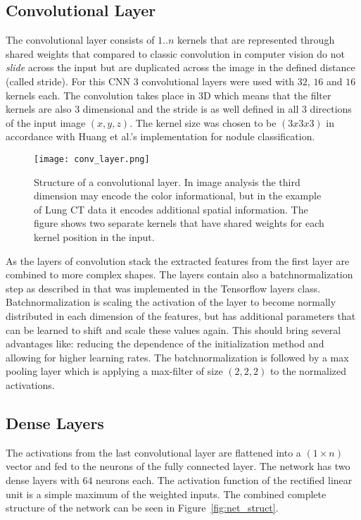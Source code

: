 \documentclass[main.tex]{subfiles}
\begin{document}
\subsection{Convolutional Layer}\label{ss:convlayer}
The convolutional layer consists of $1..n$ kernels that are represented through shared weights that compared to classic convolution in computer vision do not \emph{slide} across the input but are duplicated across the image in the defined distance (called stride). For this CNN $3$ convolutional layers were used with $32$, $16$ and $16$ kernels each. The convolution takes place in 3D which means that the filter kernels are also 3 dimensional and the stride is as well defined in all 3 directions of the input image $(x,y,z)$. The kernel size was chosen to be $(3x3x3)$ in accordance with Huang et al.'s\cite{huang2017lung} implementation for nodule classification. 

\begin{figure}
\begin{center}
\texttt{[image: conv\_layer.png]}
\end{center}
\caption{Structure of a convolutional layer. In image analysis the third dimension may encode the color informational, but in the example of Lung CT data it encodes additional spatial information. The figure shows two separate kernels that have shared weights for each kernel position in the input.}
\label{fig:conv_layer}
\end{figure}

As the layers of convolution stack the extracted features from the first layer are combined to more complex shapes. The layers contain also a batchnormalization step as described in \cite{ioffe2015batch} that was implemented in the Tensorflow layers class. Batchnormalization is scaling the activation of the layer to become normally distributed in each dimension of the features, but has additional parameters that can be learned to shift and scale these values again. This should bring several advantages like: reducing the dependence of the initialization method and allowing for higher learning rates. The batchnormalization is followed by a max pooling layer which is applying a max-filter of size $(2,2,2)$ to the normalized activations.


\subsection{Dense Layers}
The activations from the last convolutional layer are flattened into a $(1 \times n)$ vector and fed to the neurons of the fully connected layer. The network has two dense layers with $64$ neurons each. The activation function of the rectified linear unit is a simple maximum of the weighted inputs. The combined complete structure of the network can be seen in Figure~\ref{fig:net_struct}.
\end{document}
